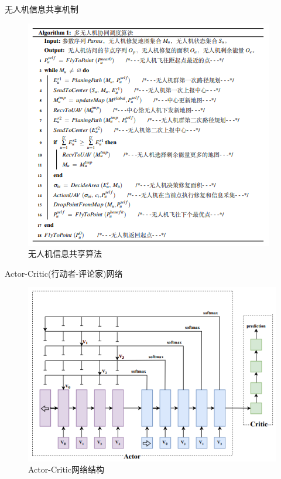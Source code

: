 \documentclass{beamer}
\begin{document}
\begin{frame}{无人机信息共享机制}
    \begin{figure}[htbp]
        \centering
        \includegraphics[scale=0.9]{pic/5.png}
        \caption{无人机信息共享算法}
    \end{figure}
\end{frame}

\begin{frame}{Actor-Critic(行动者-评论家)网络}

    \begin{figure}[htbp]
        \centering
        \includegraphics[scale=0.9]{pic/7.png}
        \caption{Actor-Critic网络结构}
    \end{figure}
\end{frame}
\end{document}
